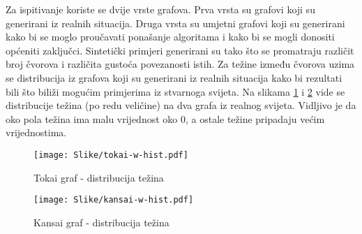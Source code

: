\documentclass[times, utf8, diplomski, numeric]{fer}
\begin{document}
Za ispitivanje koriste se dvije vrste grafova. Prva vrsta su grafovi koji su generirani iz realnih situacija. Druga vrsta su umjetni grafovi koji su generirani kako bi se moglo proučavati ponašanje algoritama i kako bi se mogli donositi općeniti zaključci. Sintetički primjeri generirani su tako što se promatraju različit broj čvorova i različita gustoća povezanosti istih. Za težine između čvorova uzima se distribucija iz grafova koji su generirani iz realnih situacija kako bi rezultati bili što biliži mogućim primjerima iz stvarnoga svijeta. Na slikama \ref{fig:tokai-hist} i \ref{fig:kansai-hist} vide se distribucije težina (po redu veličine) na dva grafa iz realnog svijeta. Vidljivo je da oko pola težina ima malu vrijednost oko $0$, a ostale težine pripadaju većim vrijednostima.

\begin{figure}[H]
	\texttt{[image: Slike/tokai-w-hist.pdf]}
	\caption{Tokai graf - distribucija težina}
	\label{fig:tokai-hist}
\end{figure}


\begin{figure}[H]
	\texttt{[image: Slike/kansai-w-hist.pdf]}
	\caption{Kansai graf - distribucija težina}
	\label{fig:kansai-hist}
\end{figure}
\end{document}
